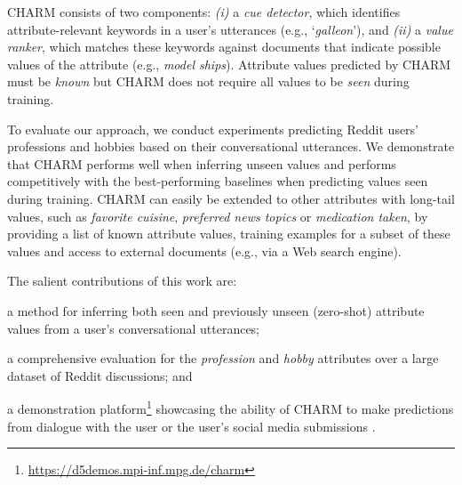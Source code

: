 CHARM consists of two components: \emph{(i)} a \textit{cue detector}, which identifies attribute-relevant keywords in a user's utterances 
(e.g., `\textit{galleon}'), and \emph{(ii)} a \textit{value ranker}, which matches these keywords against documents that indicate possible values of the attribute (e.g., \textit{model ships}). 
Attribute values predicted by CHARM must be \textit{known} but CHARM does not require all values to be \textit{seen} during training. 

To evaluate our approach, we conduct experiments predicting Reddit users' professions and hobbies based on their conversational utterances. We demonstrate that CHARM performs well when inferring unseen values and performs competitively with the best-performing baselines when 
predicting values seen during training. 
CHARM can easily be extended to other attributes with long-tail values, such as 
{\em favorite cuisine}, {\em preferred news topics} or {\em medication taken}, by providing a list of known attribute values, training examples for a subset of these values and access to external documents (e.g., via a Web search engine).

\vspace{0.1cm}
The salient contributions of this work are:
\squishlist
    \item a method for inferring both seen and previously unseen (zero-shot) attribute values from a user's conversational utterances;
    \item a comprehensive evaluation 
    for the \textit{profession} and \textit{hobby} attributes over a large dataset of Reddit discussions;
and \item a demonstration platform\footnote{\url{https://d5demos.mpi-inf.mpg.de/charm}} showcasing the ability of CHARM to make predictions from dialogue with the user or the user's social media submissions \cite{tigunova2021exploring}.
\squishend

